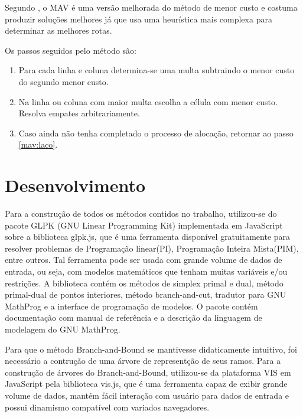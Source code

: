\documentclass [11pt]{articleSBPO}
\begin{document}
Segundo \cite{TAHA}, o MAV é uma versão melhorada do método de menor custo e costuma produzir soluções melhores já que usa uma heurística mais complexa para determinar as melhores rotas.

Os passos seguidos pelo método são:

\begin{enumerate}
	\item Para cada linha e coluna determina-se uma multa subtraindo o menor custo do segundo menor custo. \label{mav:laco}
	\item Na linha ou coluna com maior multa escolha a célula com menor custo. Resolva empates arbitrariamente.
	\item Caso ainda não tenha completado o processo de alocação, retornar ao passo \ref{mav:laco}.
\end{enumerate}

\section{Desenvolvimento}\label{sec:desenvolvimento}

Para a construção de todos os métodos contidos no trabalho, utilizou-se do pacote GLPK (GNU Linear Programming Kit) implementada em JavaScript sobre a biblioteca glpk.js, que é uma ferramenta disponível gratuitamente para resolver problemas de Programação linear(PI), Programação Inteira Mista(PIM), entre outros. Tal ferramenta pode ser usada com grande volume de dados de entrada, ou seja, com modelos matemáticos que tenham muitas variáveis e/ou restrições. A biblioteca contém os métodos de simplex primal e dual, método primal-dual de pontos interiores, método branch-and-cut, tradutor para GNU MathProg e a interface de programação de modelos. O pacote contém documentação com manual de referência e a descrição da linguagem de modelagem do GNU MathProg.

Para que o método Branch-and-Bound se mantivesse didaticamente intuitivo, foi necessário a contrução de uma árvore de representção de seus ramos. Para a construção de árvores do Branch-and-Bound, utilizou-se da plataforma VIS em JavaScript pela biblioteca vis.js, que é uma ferramenta capaz de exibir grande volume de dados, mantém fácil interação com usuário para dados de entrada e possui dinamismo compatível com variados navegadores.
\end{document}
